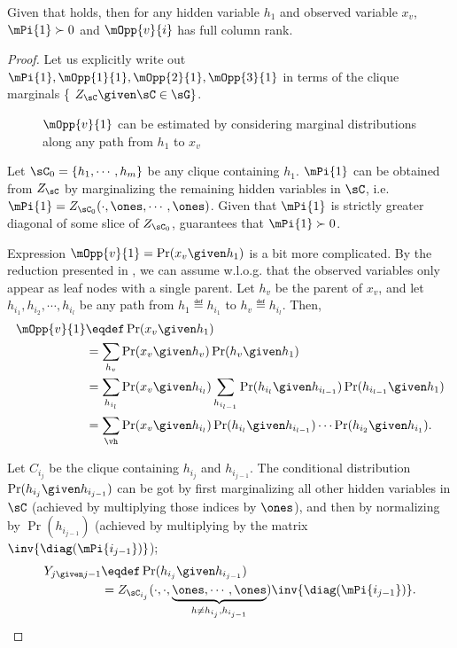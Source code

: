 \begin{lemma}
  \label{lem:full-rank-suff}
  Given that  holds, then for any hidden
  variable $h_1$ and observed variable $x_v$, $\mPi{1} \succ 0$ and
  $\mOpp{v}{i}$ has full column rank.
\end{lemma}

\begin{proof}
Let us explicitly write out $\mPi{1}, \mOpp{1}{1}, \mOpp{2}{1},
\mOpp{3}{1}$ in terms of the clique marginals \{ $Z_\sC \given \sC \in \sG \}$.

\begin{figure}[t]
  \label{fig:assumption-2}
  \centering
  
  \caption{$\mOpp{v}{1}$ can be estimated by considering marginal distributions along any path from $h_1$ to $x_v$}
\end{figure}

Let $\sC_0 = \{h_1, \cdots, h_m\}$ be any clique containing
  $h_1$. $\mPi{1}$ can be obtained from $Z_\sC$ by marginalizing the
  remaining hidden variables in $\sC$, i.e. $\mPi{1} = Z_{\sC_0}(\cdot,
  \ones, \cdots, \ones)$.
Given that $\mPi{1}$ is strictly greater diagonal of some slice of $Z_{\sC_0}$,
   guarantees that $\mPi{1} \succ 0$.

Expression $\mOpp{v}{1} = \Pr(x_v \given h_1)$ is a bit more
  complicated. 
By the reduction presented in , we can assume
  w.l.o.g. that the observed variables only appear as leaf nodes with
  a single parent. 
Let $h_v$ be the parent of $x_v$, and let $h_{i_1}, h_{i_2}, \cdots, h_{i_l}$ be any
  path from $h_1 \eqdef h_{i_1}$ to $h_v \eqdef h_{i_l}$.
Then,
\begin{align*}
  \mOpp{v}{1} &\eqdef \Pr( x_v \given h_1 )  \\
              &= \sum_{h_v} \Pr( x_v \given h_v ) \Pr( h_v \given h_1 ) \\
              &= \sum_{h_{i_l}} \Pr( x_v \given h_{i_l} ) \sum_{h_{i_{l-1}}} \Pr( h_{i_{l}} \given h_{i_{l-1}} ) \Pr( h_{i_{l-1}} \given h_1 ) \\
              &= \sum_{\vh} \Pr( x_v \given h_{i_l} ) \Pr( h_{i_{l}} \given
              h_{i_{l-1}} ) \cdots \Pr( h_{i_2} \given h_{i_1} ).
\end{align*}

Let $C_{i_j}$ be the clique containing $h_{i_j}$ and $h_{i_{j-1}}$. 
The conditional distribution $\Pr( h_{i_j} \given h_{i_{j-1}} )$ can be
  got by first marginalizing all other hidden variables in $\sC$ (achieved by
  multiplying those indices by $\ones$), and then by normalizing by $\Pr(h_{i_{j-1}})$ (achieved by multiplying by the matrix $\inv{\diag(\mPi{i_{j-1}})}$); 
\begin{align*}
  Y_{j \given j-1} 
    &\eqdef \Pr( h_{i_j} \given h_{i_{j-1}} ) \\
    &= Z_{\sC_{i_j}}(\cdot, \cdot, \underbrace{\ones, \cdots, \ones}_{h \neq h_{i_j}, h_{i_{j-1}}})
        \inv{\diag(\mPi{i_{j-1}})}.
\end{align*}


\end{proof}
